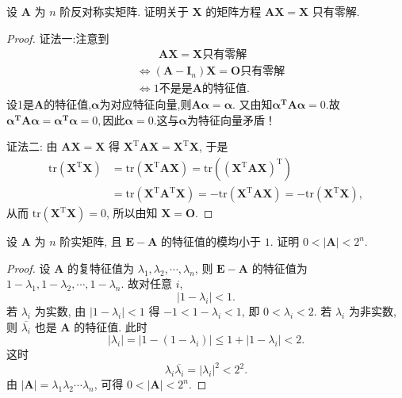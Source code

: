 \documentclass[../../main.tex]{subfiles}
\begin{document}
\begin{example}
设 $\boldsymbol{A}$ 为 $n$ 阶反对称实矩阵. 证明关于 $\boldsymbol{X}$ 的矩阵方程 $\boldsymbol{AX} = \boldsymbol{X}$ 只有零解.
\end{example}
\begin{proof}
{\color{blue}证法一:}注意到
\begin{align*}
&\quad \quad \boldsymbol{AX}=\boldsymbol{X}\text{只有零解}
\\
&\Longleftrightarrow \left( \boldsymbol{A}-\boldsymbol{I}_n \right) \boldsymbol{X}=\boldsymbol{O}\text{只有零解}
\\
&\Longleftrightarrow 1\text{不是是}\boldsymbol{A}\text{的特征值}.
\end{align*}
设1是$\boldsymbol{A}$的特征值,$\boldsymbol{\alpha }$为对应特征向量,则$\boldsymbol{A\alpha }=\boldsymbol{\alpha }$.
又由知$\boldsymbol{\alpha }^{\boldsymbol{T}}\boldsymbol{A\alpha }=0.$故$\boldsymbol{\alpha }^{\boldsymbol{T}}\boldsymbol{A\alpha }=\boldsymbol{\alpha }^{\boldsymbol{T}}\boldsymbol{\alpha }=0,$因此$\boldsymbol{\alpha }=0.$这与$\boldsymbol{\alpha }$为特征向量矛盾！

{\color{blue}证法二:}
由 $\boldsymbol{AX} = \boldsymbol{X}$ 得 $\boldsymbol{X}^\mathrm{T}\boldsymbol{A}\boldsymbol{X} = \boldsymbol{X}^\mathrm{T}\boldsymbol{X}$, 于是
\begin{align*}
\mathrm{tr}\left( \boldsymbol{X}^\mathrm{T}\boldsymbol{X} \right) &= \mathrm{tr}\left( \boldsymbol{X}^\mathrm{T}\boldsymbol{A}\boldsymbol{X} \right) = \mathrm{tr}\left( \left( \boldsymbol{X}^\mathrm{T}\boldsymbol{A}\boldsymbol{X} \right)^\mathrm{T} \right) \\
&= \mathrm{tr}\left( \boldsymbol{X}^\mathrm{T}\boldsymbol{A}^\mathrm{T}\boldsymbol{X} \right) = -\mathrm{tr}\left( \boldsymbol{X}^\mathrm{T}\boldsymbol{A}\boldsymbol{X} \right) = -\mathrm{tr}\left( \boldsymbol{X}^\mathrm{T}\boldsymbol{X} \right),
\end{align*}
从而 $\mathrm{tr}\left( \boldsymbol{X}^\mathrm{T}\boldsymbol{X} \right) = 0$, 所以由知 $\boldsymbol{X} = \boldsymbol{O}$.
\end{proof}

\begin{example}
设 $\boldsymbol{A}$ 为 $n$ 阶实矩阵, 且 $\boldsymbol{E} - \boldsymbol{A}$ 的特征值的模均小于 $1$. 证明 $0 < |\boldsymbol{A}| < 2^n$.
\end{example}
\begin{proof}
设 $\boldsymbol{A}$ 的复特征值为 $\lambda_1, \lambda_2, \cdots, \lambda_n$, 则 $\boldsymbol{E} - \boldsymbol{A}$ 的特征值为 $1 - \lambda_1, 1 - \lambda_2, \cdots, 1 - \lambda_n$. 故对任意 $i$,
\[
|1 - \lambda_i| < 1.
\]
若 $\lambda_i$ 为实数, 由 $|1 - \lambda_i| < 1$ 得 $-1 < 1 - \lambda_i < 1$, 即 $0 < \lambda_i < 2$.
若 $\lambda_i$ 为非实数, 则 $\overline{\lambda_i}$ 也是 $\boldsymbol{A}$ 的特征值. 此时
\[
|\lambda_i| = |1 - (1 - \lambda_i)| \leqslant 1 + |1 - \lambda_i| < 2.
\]
这时
\[
\lambda_i \overline{\lambda_i} = |\lambda_i|^2 < 2^2.
\]
由 $|\boldsymbol{A}| = \lambda_1 \lambda_2 \cdots \lambda_n$, 可得 $0 < |\boldsymbol{A}| < 2^n$.
\end{proof}
\end{document}

